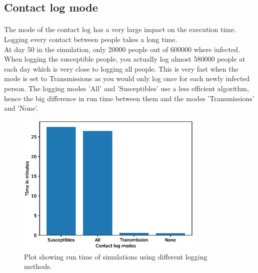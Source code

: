 \documentclass[runningheads]{llncs}
\begin{document}
\subsection{Contact log mode}

\paragraph{} The mode of the contact log has a very large impact on the execution time. Logging every contact between people takes a long time.\\
At day 50 in the simulation, only 20000 people out of 600000 where infected. When logging the susceptible people, you actually log almost 580000 people at each day which is very close to logging all people. This is very fast when the mode is set to Transmissions as you would only log once for each newly infected person. The logging modes 'All' and 'Susceptibles' use a less efficient algorithm, hence the big difference in run time between them and the modes 'Transmissions' and 'None'.\\

\begin{figure}[h!]
\centering
	\includegraphics[width=0.8\textwidth]{3_Performance_Profiling/3_contactlogmode.eps}
	\caption{Plot showing run time of simulations using different logging methods.} 
	\label{Gprof_contactlogmode}
\end{figure}
\end{document}
